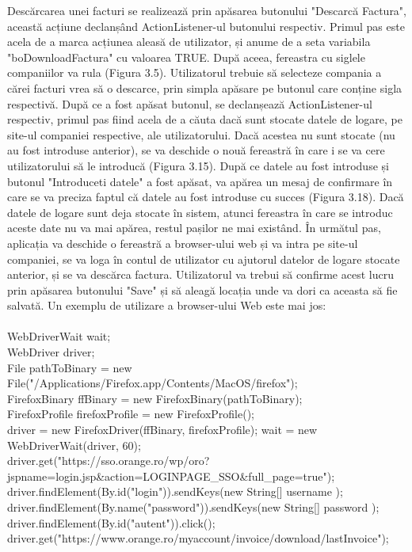 \documentclass[12pt]{book}
\begin{document}
Descărcarea unei facturi se realizează prin apăsarea butonului "Descarcă Factura", această acțiune declanșând ActionListener-ul butonului respectiv.  Primul pas este acela de a marca acțiunea aleasă de utilizator, și anume de a seta variabila "boDownloadFactura" cu valoarea TRUE. După aceea, fereastra cu siglele companiilor va rula (Figura 3.5). Utilizatorul trebuie să selecteze compania a cărei facturi vrea să o descarce, prin simpla apăsare pe butonul care conține sigla respectivă. După ce a fost apăsat butonul, se declanșează ActionListener-ul respectiv, primul pas fiind acela de a căuta dacă sunt stocate datele de logare, pe site-ul companiei respective, ale utilizatorului. Dacă acestea nu sunt stocate (nu au fost introduse anterior), se va deschide o nouă fereastră în care i se va cere utilizatorului să le introducă (Figura 3.15). După ce datele au fost introduse și butonul "Introduceti datele" a fost apăsat, va apărea un mesaj de confirmare în care se va preciza faptul că datele au fost introduse cu succes (Figura 3.18). Dacă datele de logare sunt deja stocate în sistem, atunci fereastra în care se introduc aceste date nu va mai apărea, restul pașilor ne mai existând. În următul pas, aplicația va deschide o fereastră a browser-ului web și va intra pe site-ul companiei, se va loga în contul de utilizator cu ajutorul datelor de logare stocate anterior, și se va descărca factura. Utilizatorul va trebui să confirme acest lucru prin apăsarea butonului "Save" și să aleagă locația unde va dori ca aceasta să fie salvată. Un exemplu de utilizare a browser-ului Web este mai jos:\\\\
WebDriverWait wait;\\
WebDriver driver;\\
File pathToBinary = new File("/Applications/Firefox.app/Contents/MacOS/firefox");\\
FirefoxBinary ffBinary = new FirefoxBinary(pathToBinary);\\
FirefoxProfile firefoxProfile = new FirefoxProfile();\\
driver = new FirefoxDriver(ffBinary, firefoxProfile);
wait = new WebDriverWait(driver, 60);\\
driver.get("https://sso.orange.ro/wp/oro?jspname=login.jsp\&action=LOGINPAGE\_SSO\&full\_page=true");\\
driver.findElement(By.id("login")).sendKeys(new String[] { username });\\
driver.findElement(By.name("password")).sendKeys(new String[] { password });\\
driver.findElement(By.id("autent")).click();\\
driver.get("https://www.orange.ro/myaccount/invoice/download/lastInvoice");\\
\end{document}
